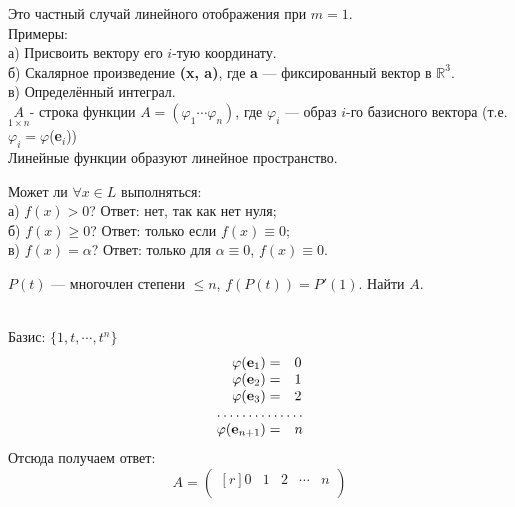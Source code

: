 Это частный случай линейного отображения при $m=1$.\\
Примеры:\\ %
а) Присвоить вектору его $i$-тую координату.\\
б) Скалярное произведение \textbf{(\textbf{x}, \textbf{a})}, где \textbf{a} --- фиксированный вектор в $\mathbb{R}^3$.\\
в) Определённый интеграл.\\

$\underset{1 \times n}A$- строка функции $A=(\varphi_1 \cdots \varphi_n)$, где $\varphi_i$ --- образ $i$-го базисного вектора (т.е. $\varphi_i=\varphi$(\textbf{e$_i$}))\\

Линейные функции образуют линейное пространство.

\begin{prim}
	Может ли $ \forall x \in L$ выполняться:\\
	а) $f(x)>0$? Ответ: нет, так как нет нуля;\\
	б) $f(x)\geq 0$? Ответ: только если $f(x)\equiv0$;\\
	в) $f(x)=\alpha $? Ответ: только для $\alpha\equiv0$, $f(x)\equiv0$.\\
\end{prim}
\begin{prim}
	$P(t)$ ---  многочлен степени $\leq n$, $f(P(t))=P'(1)$. Найти $A$.
\end{prim}\\

Базис: $\{ 1, t,\cdots, t^n\}$\\
$$
\begin{array}{rl}
\varphi (\text{\textbf{e$_1$}})=&0\\
\varphi (\text{\textbf{e$_2$}})=&1\\
\varphi (\text{\textbf{e$_3$}})=&2\\
\hdotsfor{2}\\
\varphi (\text{\textbf{e$_{n+1}$}})=&n\\
\end{array}
$$
Отсюда получаем ответ:
$$A=
\begin{pmatrix*}[r]
0 & 1 & 2 & \cdots & n\\
\end{pmatrix*}$$